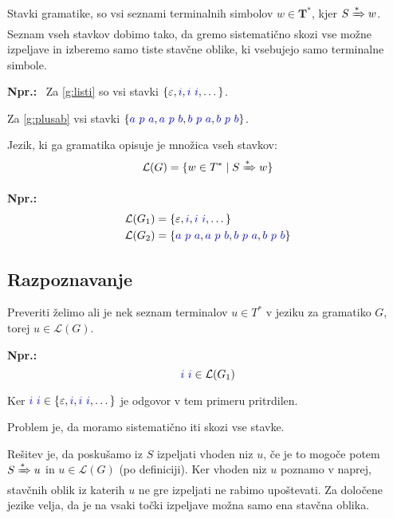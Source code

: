 \documentclass{article}
\newcommand{\Ex}{\textbf{Npr.:}\ }
\newcommand{\Set}[1]{\mathbf{#1}}
\newcommand{\Symbol}[1]{\textcolor{blue}{#1}}
\newcommand{\Grammar}{G}
\newcommand{\Terminals}{\Set{T}}
\newcommand{\StartSymbol}{S}
\newcommand{\Null}{\varepsilon}
\newcommand{\Language}[1]{\mathcal{L}(#1)}
\newcommand{\DeriveStar}{\xRightarrow{\ast}}
\newcommand{\Seq}{\ }
\newcommand{\Kleene}[1]{#1^\ast}
\begin{document}
Stavki gramatike, so vsi seznami terminalnih simbolov $w \in \Kleene{\Terminals}$, kjer $\StartSymbol \DeriveStar w$.
Seznam vseh stavkov dobimo tako, da gremo sistematično skozi vse možne izpeljave in izberemo samo tiste stavčne oblike, ki vsebujejo samo terminalne simbole.

\Ex
Za \ref{g:listi} so vsi stavki $\{\Null, \Symbol{i}, \Symbol{i} \Seq \Symbol{i}, \dots\}$.

Za \ref{g:plusab} vsi stavki $\{\Symbol{a} \Seq \Symbol{p} \Seq \Symbol{a}, \Symbol{a} \Seq \Symbol{p} \Seq \Symbol{b}, \Symbol{b} \Seq \Symbol{p} \Seq \Symbol{a}, \Symbol{b} \Seq \Symbol{p} \Seq \Symbol{b} \}$.

Jezik, ki ga gramatika opisuje je množica vseh stavkov:
\begin{equation*}
  \Language{\Grammar} = \{ w \in \Kleene{T} \mid \StartSymbol \DeriveStar w\}
\end{equation*}

\Ex
  \begin{align*}
    \Language{\Grammar_1} &= \{\Null, \Symbol{i}, \Symbol{i} \Seq \Symbol{i}, \dots\}\\
    \Language{\Grammar_2} &= \{\Symbol{a} \Seq \Symbol{p} \Seq \Symbol{a}, \Symbol{a} \Seq \Symbol{p} \Seq \Symbol{b}, \Symbol{b} \Seq \Symbol{p} \Seq \Symbol{a}, \Symbol{b} \Seq \Symbol{p} \Seq \Symbol{b} \}
  \end{align*}

\subsection{Razpoznavanje}

Preveriti želimo ali je nek seznam terminalov $u \in \Kleene{T}$ v jeziku za gramatiko $\Grammar$, torej $u \in \Language{\Grammar}$.

\Ex
  \begin{equation*}
    \Symbol{i} \Seq \Symbol{i} \in \Language{\Grammar_1}
  \end{equation*}

  Ker $\Symbol{i} \Seq \Symbol{i} \in \{\Null, \Symbol{i}, \Symbol{i} \Seq \Symbol{i}, \dots\}$ je odgovor v tem primeru pritrdilen.

Problem je, da moramo sistematično iti skozi vse stavke.

Rešitev je, da poskušamo iz $\StartSymbol$ izpeljati vhoden niz $u$, če je to mogoče potem $\StartSymbol \DeriveStar u$ in $u \in \Language{\Grammar}$ (po definiciji).
Ker vhoden niz $u$ poznamo v naprej, stavčnih oblik iz katerih $u$ ne gre izpeljati ne rabimo upoštevati.
Za določene jezike velja, da je na vsaki točki izpeljave možna samo ena stavčna oblika.
\end{document}
